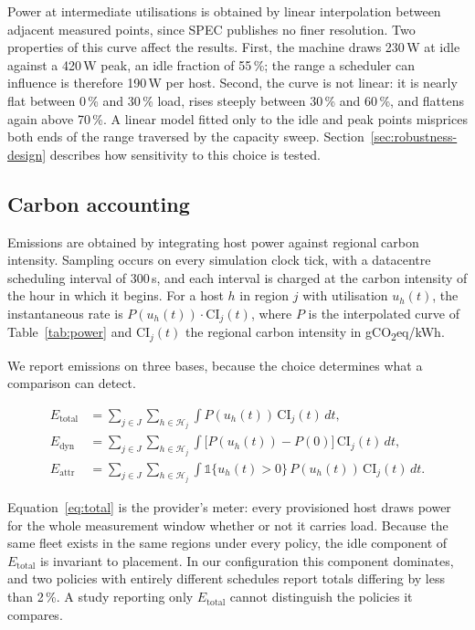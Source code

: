 Power at intermediate utilisations is obtained by linear interpolation between
adjacent measured points, since SPEC publishes no finer resolution. Two
properties of this curve affect the results. First, the machine draws 230\,W at
idle against a 420\,W peak, an idle fraction of 55\,\%; the range a scheduler
can influence is therefore 190\,W per host. Second, the curve is not linear: it
is nearly flat between 0\,\% and 30\,\% load, rises steeply between 30\,\% and
60\,\%, and flattens again above 70\,\%. A linear model fitted only to the idle
and peak points misprices both ends of the range traversed by the capacity
sweep. Section~\ref{sec:robustness-design} describes how sensitivity to this
choice is tested.

\subsection{Carbon accounting}
\label{sec:accounting}

Emissions are obtained by integrating host power against regional carbon
intensity. Sampling occurs on every simulation clock tick, with a datacentre
scheduling interval of 300\,s, and each interval is charged at the carbon
intensity of the hour in which it begins. For a host $h$ in region $j$ with
utilisation $u_h(t)$, the instantaneous rate is
$P(u_h(t)) \cdot \mathrm{CI}_j(t)$, where $P$ is the interpolated curve of
Table~\ref{tab:power} and $\mathrm{CI}_j(t)$ the regional carbon intensity in
gCO\textsubscript{2}eq/kWh.

We report emissions on three bases, because the choice determines what a
comparison can detect.

\begin{align}
E_{\mathrm{total}} &= \sum_{j \in J} \sum_{h \in \mathcal{H}_j} \int P(u_h(t))\,\mathrm{CI}_j(t)\,dt ,
\label{eq:total}\\[2pt]
E_{\mathrm{dyn}}   &= \sum_{j \in J} \sum_{h \in \mathcal{H}_j} \int \bigl[P(u_h(t)) - P(0)\bigr]\,\mathrm{CI}_j(t)\,dt ,
\label{eq:dyn}\\[2pt]
E_{\mathrm{attr}}  &= \sum_{j \in J} \sum_{h \in \mathcal{H}_j} \int \mathbb{1}\{u_h(t) > 0\}\, P(u_h(t))\,\mathrm{CI}_j(t)\,dt .
\label{eq:attr}
\end{align}

Equation~\eqref{eq:total} is the provider's meter: every provisioned host draws
power for the whole measurement window whether or not it carries load. Because
the same fleet exists in the same regions under every policy, the idle
component of $E_{\mathrm{total}}$ is invariant to placement. In our
configuration this component dominates, and two policies with entirely
different schedules report totals differing by less than 2\,\%. A study
reporting only $E_{\mathrm{total}}$ cannot distinguish the policies it compares.

